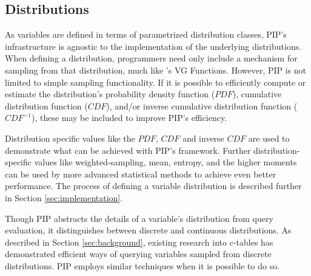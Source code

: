 \subsection{Distributions}
As variables are defined in terms of parametrized distribution classes, PIP's infrastructure is agnostic to the implementation of the underlying distributions.  When defining a distribution, programmers need only include a mechanism for sampling from that distribution, much like \cite{MCDB}'s VG Functions.  However, PIP is not limited to simple sampling functionality.  If it is possible to efficiently compute or estimate the distribution's probability density function ($PDF$), cumulative distribution function ($CDF$), and/or inverse cumulative distribution function ($CDF^{-1}$), these may be included to improve PIP's efficiency.  

Distribution specific values like the $PDF$, $CDF$ and inverse $CDF$ are used to demonstrate what can be achieved with PIP's framework.  Further distribution-specific values like weighted-sampling, mean, entropy, and the higher moments can be used by more advanced statistical methods to achieve even better performance.  The process of defining a variable distribution is described further in Section \ref{sec:implementation}.  

Though PIP abstracts the details of a variable's distribution from query evaluation, it distinguishes between discrete and continuous distributions.  As described in Section \ref{sec:background}, existing research into c-tables has demonstrated efficient ways of querying variables sampled from discrete distributions.  PIP employs similar techniques when it is possible to do so.


